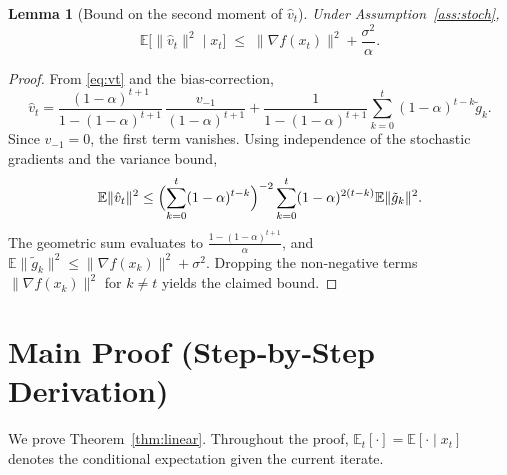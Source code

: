 \documentclass{article}
\newtheorem{lemma}{Lemma}[section]
\begin{document}
\begin{lemma}[Bound on the second moment of $\hat v_t$]\label{lem:second}
Under Assumption~\ref{ass:stoch},
\[
\mathbb{E}\!\bigl[\|\hat v_t\|^2\mid x_t\bigr]
\;\le\;
\|\nabla f(x_t)\|^2+\frac{\sigma^2}{\alpha}.
\]
\end{lemma}
\begin{proof}
From \eqref{eq:vt} and the bias‑correction,
\[
\hat v_t = \frac{(1-\alpha)^{t+1}}{1-(1-\alpha)^{t+1}}\,\frac{v_{-1}}{(1-\alpha)^{t+1}}
        +\frac{1}{1-(1-\alpha)^{t+1}}\sum_{k=0}^{t}(1-\alpha)^{t-k}\tilde g_k .
\]
Since $v_{-1}=0$, the first term vanishes.  Using independence of the
stochastic gradients and the variance bound,
\[
\mathbb{E}\|\hat v_t\|^2
\le\Bigl(\sum_{k=0}^{t}(1-\alpha)^{t-k}\Bigr)^{-2}
      \sum_{k=0}^{t}(1-\alpha)^{2(t-k)}\mathbb{E}\|\tilde g_k\|^2 .
\]
The geometric sum evaluates to $\frac{1-(1-\alpha)^{t+1}}{\alpha}$,
and $\mathbb{E}\|\tilde g_k\|^2\le\|\nabla f(x_k)\|^2+\sigma^2$.
Dropping the non‑negative terms $\|\nabla f(x_k)\|^2$ for $k\neq t$ yields
the claimed bound.
\end{proof}

\section*{Main Proof (Step‑by‑Step Derivation)}
We prove Theorem~\ref{thm:linear}.  Throughout the proof,
$\mathbb{E}_t[\cdot]=\mathbb{E}[\cdot\mid x_t]$ denotes the conditional
expectation given the current iterate.
\end{document}
